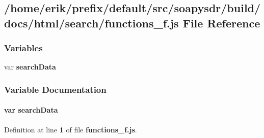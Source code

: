 \subsection{/home/erik/prefix/default/src/soapysdr/build/docs/html/search/functions\+\_\+f.js File Reference}
\label{functions__f_8js}
\subsubsection*{Variables}
\begin{DoxyCompactItemize}
\item 
var {\bf search\+Data}
\end{DoxyCompactItemize}


\subsubsection{Variable Documentation}
\paragraph[{search\+Data}]{\setlength{\rightskip}{0pt plus 5cm}var search\+Data}\label{functions__f_8js_ad01a7523f103d6242ef9b0451861231e}


Definition at line {\bf 1} of file {\bf functions\+\_\+f.\+js}.

